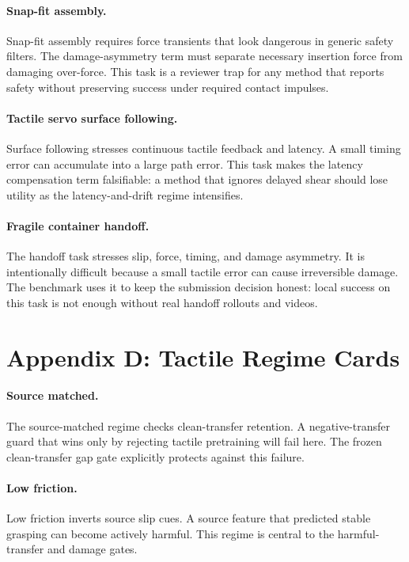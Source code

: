 \documentclass{article}
\begin{document}
\paragraph{Snap-fit assembly.}
Snap-fit assembly requires force transients that look dangerous in generic safety filters. The damage-asymmetry term must separate necessary insertion force from damaging over-force. This task is a reviewer trap for any method that reports safety without preserving success under required contact impulses.

\paragraph{Tactile servo surface following.}
Surface following stresses continuous tactile feedback and latency. A small timing error can accumulate into a large path error. This task makes the latency compensation term falsifiable: a method that ignores delayed shear should lose utility as the latency-and-drift regime intensifies.

\paragraph{Fragile container handoff.}
The handoff task stresses slip, force, timing, and damage asymmetry. It is intentionally difficult because a small tactile error can cause irreversible damage. The benchmark uses it to keep the submission decision honest: local success on this task is not enough without real handoff rollouts and videos.

\clearpage
\section{Appendix D: Tactile Regime Cards}
\paragraph{Source matched.}
The source-matched regime checks clean-transfer retention. A negative-transfer guard that wins only by rejecting tactile pretraining will fail here. The frozen clean-transfer gap gate explicitly protects against this failure.

\paragraph{Low friction.}
Low friction inverts source slip cues. A source feature that predicted stable grasping can become actively harmful. This regime is central to the harmful-transfer and damage gates.
\end{document}
